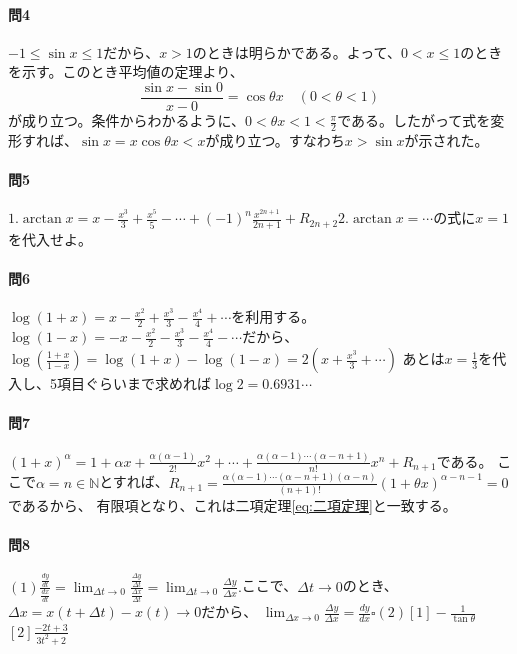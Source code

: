 \documentclass[a4j,dvipdfmx]{jsarticle}
\begin{document}
                    \paragraph{問4}$-1\leq \sin x \leq 1$だから、$x>1$のときは明らかである。よって、$0<x\leq 1$のときを示す。このとき平均値の定理より、
                    \begin{equation*}
                        \frac{\sin x-\sin 0}{x-0}=\cos \theta x \quad (0<\theta<1)
                    \end{equation*}
                    が成り立つ。条件からわかるように、$0<\theta x<1<\frac{\pi}{2}$である。したがって式を変形すれば、$\sin x = x\cos\theta x < x$が成り立つ。すなわち$x>\sin x$が示された。

                    \paragraph{問5}
                        $\displaystyle 1.\arctan x = x-\frac{x^3}{3}+\frac{x^5}{5}-\cdots +(-1)^n\frac{x^{2n+1}}{2n+1}+R_{2n+2}$\hspace{1mm}$2.\arctan x=\cdots$の式に$x=1$を代入せよ。
                    
                    \paragraph{問6}$\displaystyle \log (1+x)=x-\frac{x^2}{2}+\frac{x^3}{3}-\frac{x^4}{4}+\cdots$を利用する。
                    $\displaystyle \log(1-x)=-x-\frac{x^2}{2}-\frac{x^3}{3}-\frac{x^4}{4}-\cdots$だから、
                    $\displaystyle \log\left(\frac{1+x}{1-x}\right)=\log(1+x)-\log(1-x)=2\left(x+\frac{x^3}{3}+\cdots\right)$
                    あとは$x=\frac{1}{3}$を代入し、5項目ぐらいまで求めれば$\log 2=0.6931\cdots$
                    \clearpage
                    \paragraph{問7}$\displaystyle (1+x)^{\alpha}=1+\alpha x+\frac{\alpha(\alpha-1)}{2!}x^2+\cdots+\frac{\alpha(\alpha-1)\cdots(\alpha-n+1)}{n!}x^n+R_{n+1}$である。
                    ここで$\alpha=n\in\mathbb{N}$とすれば、$\displaystyle R_{n+1}=\frac{\alpha(\alpha-1)\cdots(\alpha-n+1)(\alpha-n)}{(n+1)!}(1+\theta x)^{\alpha-n-1}=0$であるから、
                    有限項となり、これは二項定理\eqref{eq:二項定理}と一致する。

                    \paragraph{問8}$\displaystyle(1)\frac{\frac{dy}{dt}}{\frac{dx}{dt}}=\lim_{\Delta t\to 0}\frac{\frac{\Delta y}{\Delta t}}{\frac{\Delta x}{\Delta t}}=\lim_{\Delta t\to 0}\frac{\Delta y}{\Delta x}.$ここで、$\Delta t\to 0$のとき、$\Delta x=x(t+\Delta t)-x(t)\to 0$だから、
                    $\displaystyle \lim_{\Delta x\to 0}\frac{\Delta y}{\Delta x}=\frac{dy}{dx}\square$\hspace{3mm}$(2)[1]\displaystyle-\frac{1}{\tan\theta}$\hspace{1mm}$[2]\displaystyle\frac{-2t+3}{3t^2+2}$
\end{document}
